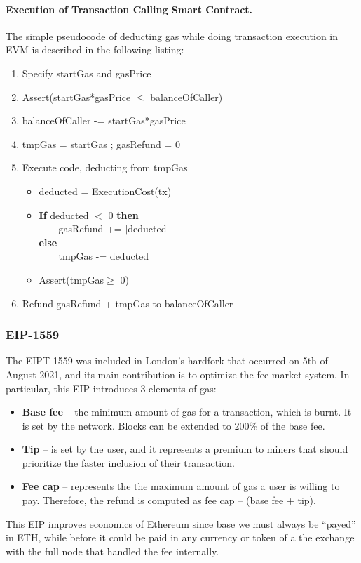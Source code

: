 \paragraph{\textbf{Execution of Transaction Calling Smart Contract.}}
The simple pseudocode of deducting gas while doing transaction execution in EVM is described in the following listing:
\begin{enumerate}
	\tightlist
	\item Specify startGas and gasPrice
	\item  Assert(startGas*gasPrice $\leq$ balanceOfCaller)
	\item  balanceOfCaller -= startGas*gasPrice
	\item tmpGas = startGas ; gasRefund = 0
	\item Execute code, deducting from tmpGas
	\begin{itemize}
		\item deducted = ExecutionCost(tx)
		\item \textbf{If} deducted $<$ 0 \textbf{then} \\
		\hspace{0.5cm} ~~~~gasRefund += $|$deducted$|$ \\
		\textbf{else} \\
		\hspace{0.5cm} ~~~~tmpGas -= deducted \\
		\item Assert(tmpGas$\geq$ 0)
	\end{itemize}
	
	\item Refund gasRefund + tmpGas to balanceOfCaller	
\end{enumerate}



\subsubsection{EIP-1559}\label{gas-and-the-ethereum-virtual-machine-evm}
The EIPT-1559  was included in London's hardfork that occurred on 5th of August 2021, and its main contribution is to optimize the fee market system.
In particular, this EIP introduces 3 elements of gas:
\begin{itemize}
	\item \textbf{Base fee} -- the minimum amount of gas for a transaction, which is burnt. It is set by the network. Blocks can be extended to 200\% of the base fee.
	
	\item \textbf{Tip} -- is set by the user, and it represents a premium to miners that should prioritize the faster inclusion of their transaction.
	
	\item \textbf{Fee cap} -- represents the the maximum amount of gas a user is willing to pay. Therefore, the refund is computed as  fee cap – (base fee + tip).	
\end{itemize}
This EIP improves economics of Ethereum since base we must always be ``payed'' in ETH, while before it could be paid in any currency or token of a the exchange with the full node that handled the fee internally.

